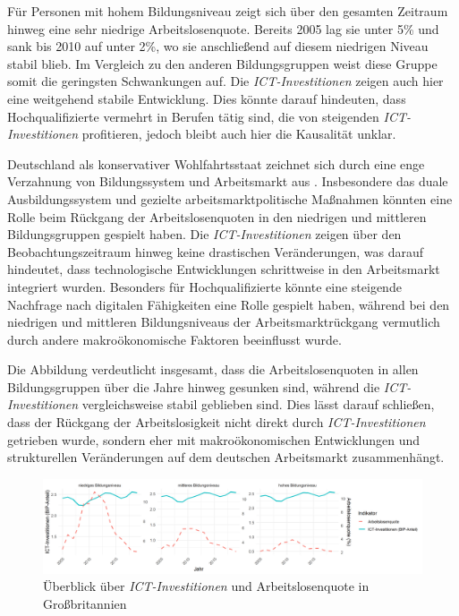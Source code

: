 Für Personen mit hohem Bildungsniveau zeigt sich über den gesamten Zeitraum hinweg 
eine sehr niedrige Arbeitslosenquote. Bereits 2005 lag sie unter 5\% und sank bis
2010 auf unter 2\%, wo sie anschließend auf diesem niedrigen Niveau stabil blieb. 
Im Vergleich zu den anderen Bildungsgruppen weist diese Gruppe somit die geringsten 
Schwankungen auf. Die \textit{\ac{ICT}-Investitionen} zeigen auch hier eine 
weitgehend stabile Entwicklung. Dies könnte darauf hindeuten, dass Hochqualifizierte 
vermehrt in Berufen tätig sind, die von steigenden \textit{\ac{ICT}-Investitionen} 
profitieren, jedoch bleibt auch hier die Kausalität unklar.

Deutschland als konservativer Wohlfahrtsstaat zeichnet sich durch eine enge Verzahnung 
von Bildungssystem und Arbeitsmarkt aus \parencite[vgl.][S. 21–22]{hall2001varieties}. 
Insbesondere das duale Ausbildungssystem und gezielte arbeitsmarktpolitische Maßnahmen 
könnten eine Rolle beim Rückgang der 
Arbeitslosenquoten in den niedrigen und mittleren Bildungsgruppen gespielt haben. 
Die \textit{\ac{ICT}-Investitionen} zeigen über den Beobachtungszeitraum hinweg keine 
drastischen Veränderungen, was darauf hindeutet, dass technologische Entwicklungen 
schrittweise in den Arbeitsmarkt integriert wurden. Besonders für Hochqualifizierte 
könnte eine steigende Nachfrage nach digitalen Fähigkeiten eine Rolle gespielt 
haben, während bei den niedrigen und mittleren Bildungsniveaus der 
Arbeitsmarktrückgang vermutlich durch andere makroökonomische Faktoren beeinflusst 
wurde.

Die Abbildung verdeutlicht insgesamt, dass die Arbeitslosenquoten in allen 
Bildungsgruppen über die Jahre hinweg gesunken sind, während die 
\textit{\ac{ICT}-Investitionen} vergleichsweise stabil geblieben sind. Dies lässt darauf 
schließen, dass der Rückgang der Arbeitslosigkeit nicht direkt durch 
\textit{\ac{ICT}-Investitionen} getrieben wurde, sondern eher mit makroökonomischen 
Entwicklungen und strukturellen Veränderungen auf dem deutschen Arbeitsmarkt 
zusammenhängt.

\begin{figure}[htbp]
    \centering
    \includegraphics[width=\textwidth]{assets/plot_uk.png}
    \caption{Überblick über \textit{\ac{ICT}-Investitionen} und Arbeitslosenquote in 
    Großbritannien}
    \label{fig:uk}
\end{figure}

